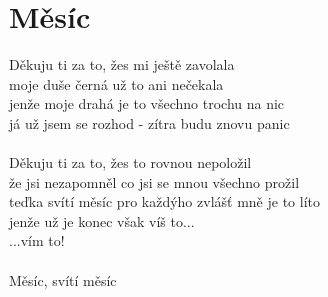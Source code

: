 \section{Měsíc}
Děkuju ti za to, žes mi ještě zavolala\\
moje duše černá už to ani nečekala\\
jenže moje drahá je to všechno trochu na nic\\
já už jsem se rozhod - zítra budu znovu panic\\
\\
Děkuju ti za to, žes to rovnou nepoložil\\
že jsi nezapomněl co jsi se mnou všechno prožil\\
teďka svítí měsíc pro každýho zvlášť mně je to líto\\
jenže už je konec však víš to...\\
...vím to!\\
\\
Měsíc, svítí měsíc\\